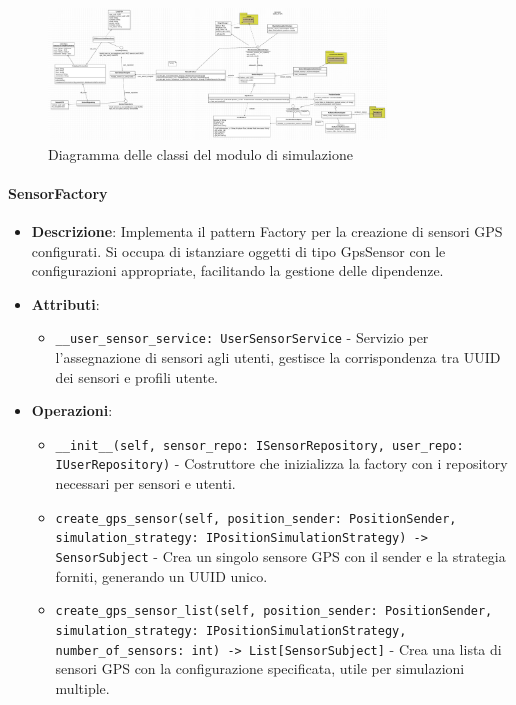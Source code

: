\documentclass[10pt]{article}
\begin{document}
    \begin{figure}[H]
        \centering
        \includegraphics[width=0.8\textwidth]{diaSimulation.png}
        \caption{Diagramma delle classi del modulo di simulazione}
        \label{fig:simulation_module}
    \end{figure}

    \paragraph{SensorFactory}
    \begin{itemize}
        \item \textbf{Descrizione}: Implementa il pattern Factory per la creazione di sensori GPS configurati. Si occupa di istanziare oggetti di tipo GpsSensor con le configurazioni appropriate, facilitando la gestione delle dipendenze.
        \item \textbf{Attributi}:
        \begin{itemize}
            \item \texttt{\_\_user\_sensor\_service: UserSensorService} - Servizio per l'assegnazione di sensori agli utenti, gestisce la corrispondenza tra UUID dei sensori e profili utente.
        \end{itemize}
        \item \textbf{Operazioni}:
        \begin{itemize}
            \item \texttt{\_\_init\_\_(self, sensor\_repo: ISensorRepository, user\_repo: IUserRepository)} - Costruttore che inizializza la factory con i repository necessari per sensori e utenti.
            \item \texttt{create\_gps\_sensor(self, position\_sender: PositionSender, simulation\_strategy: IPositionSimulationStrategy) -> SensorSubject} - Crea un singolo sensore GPS con il sender e la strategia forniti, generando un UUID unico.
            \item \texttt{create\_gps\_sensor\_list(self, position\_sender: PositionSender, simulation\_strategy: IPositionSimulationStrategy, number\_of\_sensors: int) -> List[SensorSubject]} - Crea una lista di sensori GPS con la configurazione specificata, utile per simulazioni multiple.
        \end{itemize}
    \end{itemize}
\end{document}
